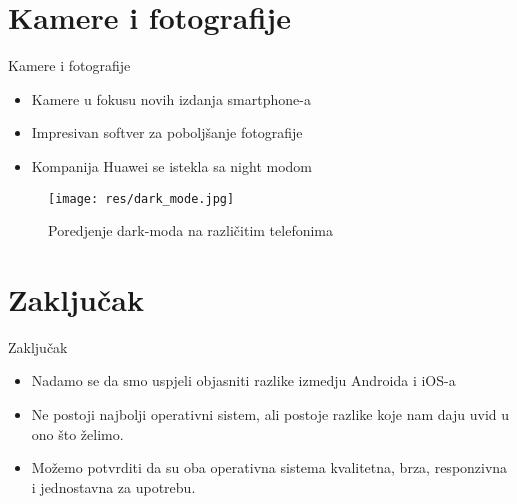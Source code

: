 \documentclass{beamer}
\begin{document}
\section{Kamere i fotografije}
\begin{frame}{Kamere i fotografije}
\begin{itemize}
\item Kamere u fokusu novih izdanja smartphone-a
\item Impresivan softver za poboljšanje fotografije
\item Kompanija Huawei se istekla sa night modom
\end{itemize}
\begin{figure}[h]
\centering
\captionsetup{}
\texttt{[image: res/dark\_mode.jpg]}
\caption{Poredjenje dark-moda na različitim telefonima}
\end{figure}

\end{frame}
\section{Zaključak}
\begin{frame}{Zaključak}
\begin{itemize}
\item Nadamo se da smo uspjeli objasniti razlike izmedju Androida i iOS-a
\item Ne postoji najbolji operativni sistem, ali postoje razlike koje nam daju uvid u ono što želimo.
\item Možemo potvrditi da su oba operativna sistema kvalitetna, brza, responzivna i jednostavna za upotrebu.
\end{itemize}
\end{frame}
\end{document}
